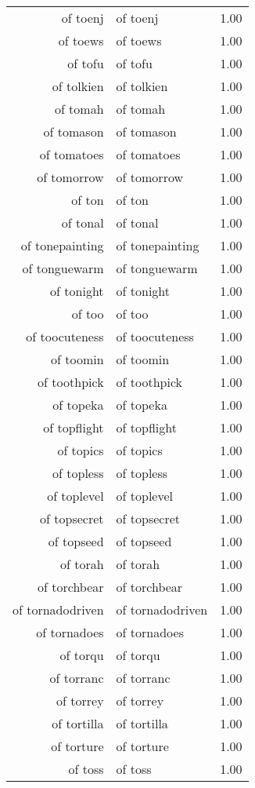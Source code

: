 \begin{table}[ht]
\begin{tabular}{rlr}
  of toenj & of toenj & 1.00 \\ 
  of toews & of toews & 1.00 \\ 
  of tofu & of tofu & 1.00 \\ 
  of tolkien & of tolkien & 1.00 \\ 
  of tomah & of tomah & 1.00 \\ 
  of tomason & of tomason & 1.00 \\ 
  of tomatoes & of tomatoes & 1.00 \\ 
  of tomorrow & of tomorrow & 1.00 \\ 
  of ton & of ton & 1.00 \\ 
  of tonal & of tonal & 1.00 \\ 
  of tonepainting & of tonepainting & 1.00 \\ 
  of tonguewarm & of tonguewarm & 1.00 \\ 
  of tonight & of tonight & 1.00 \\ 
  of too & of too & 1.00 \\ 
  of toocuteness & of toocuteness & 1.00 \\ 
  of toomin & of toomin & 1.00 \\ 
  of toothpick & of toothpick & 1.00 \\ 
  of topeka & of topeka & 1.00 \\ 
  of topflight & of topflight & 1.00 \\ 
  of topics & of topics & 1.00 \\ 
  of topless & of topless & 1.00 \\ 
  of toplevel & of toplevel & 1.00 \\ 
  of topsecret & of topsecret & 1.00 \\ 
  of topseed & of topseed & 1.00 \\ 
  of torah & of torah & 1.00 \\ 
  of torchbear & of torchbear & 1.00 \\ 
  of tornadodriven & of tornadodriven & 1.00 \\ 
  of tornadoes & of tornadoes & 1.00 \\ 
  of torqu & of torqu & 1.00 \\ 
  of torranc & of torranc & 1.00 \\ 
  of torrey & of torrey & 1.00 \\ 
  of tortilla & of tortilla & 1.00 \\ 
  of torture & of torture & 1.00 \\ 
  of toss & of toss & 1.00 \\ 

\end{tabular}
\end{table}
